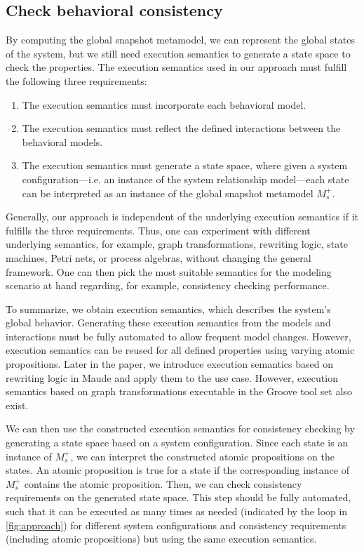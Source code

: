 \documentclass{jot}
\begin{document}
\subsection{Check behavioral consistency}

By computing the global snapshot metamodel, we can represent the global states of the system, but we still need execution semantics to generate a state space to check the properties.
The execution semantics used in our approach must fulfill the following three requirements:
\begin{enumerate}
    \item The execution semantics must incorporate each behavioral model.
    \item The execution semantics must reflect the defined interactions between the behavioral models.
    \item The execution semantics must generate a state space, where given a system configuration---i.e. an instance of the system relationship model---each state can be interpreted as an instance of the global snapshot metamodel $M_s^+$.
\end{enumerate}
Generally, our approach is independent of the underlying execution semantics if it fulfills the three requirements.
Thus, one can experiment with different underlying semantics, for example, graph transformations, rewriting logic, state machines, Petri nets, or process algebras, without changing the general framework.
One can then pick the most suitable semantics for the modeling scenario at hand regarding, for example, consistency checking performance.

To summarize, we obtain execution semantics, which describes the system's global behavior.
Generating these execution semantics from the models and interactions must be fully automated to allow frequent model changes.
However, execution semantics can be reused for all defined properties using varying atomic propositions. 
Later in the paper, we introduce execution semantics based on rewriting logic in Maude and apply them to the use case.
However, execution semantics based on graph transformations executable in the Groove tool set also exist. 

We can then use the constructed execution semantics for consistency checking by generating a state space based on a system configuration.
Since each state is an instance of $M_s^+$, we can interpret the constructed atomic propositions on the states.
An atomic proposition is true for a state if the corresponding instance of $M_s^+$ contains the atomic proposition.
Then, we can check consistency requirements on the generated state space.
This step should be fully automated, such that it can be executed as many times as needed (indicated by the loop in \autoref{fig:approach}) for different system configurations and consistency requirements (including atomic propositions) but using the same execution semantics.
\end{document}
